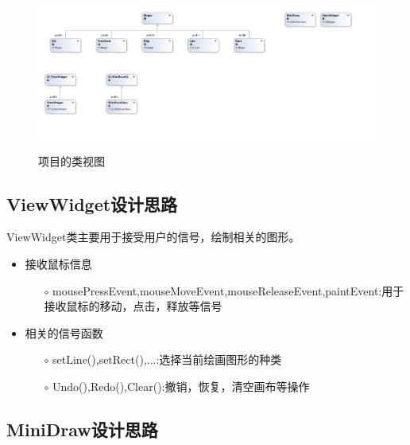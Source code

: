 \documentclass{article}
\begin{document}
	\begin{figure}[H]
		\begin{center}
			
			\includegraphics[width=16cm,height=5cm]{Class}
			
			\caption{项目的类视图} \label{Class.label}
		\end{center}
	\end{figure}

 \subsection{ViewWidget设计思路}
 
ViewWidget类主要用于接受用户的信号，绘制相关的图形。


\begin{itemize}
	\item 接收鼠标信息
	\begin{itemize}
		\item[$\circ$] mousePressEvent,mouseMoveEvent,mouseReleaseEvent,paintEvent:用于接收鼠标的移动，点击，释放等信号
	\end{itemize}
\end{itemize}

\begin{itemize}
	\item 相关的信号函数
	\begin{itemize}
		\item[$\circ$] setLine(),setRect(),...:选择当前绘画图形的种类
	\end{itemize}
	\begin{itemize}
	\item[$\circ$] Undo(),Redo(),Clear():撤销，恢复，清空画布等操作
\end{itemize}
\end{itemize}




\subsection{MiniDraw设计思路}
\end{document}
